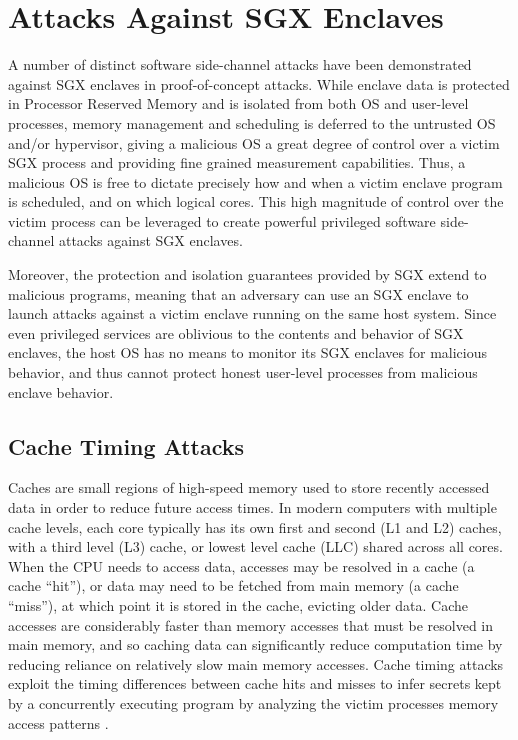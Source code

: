 \section{Attacks Against SGX Enclaves}

A number of distinct software side-channel attacks have been demonstrated against SGX enclaves in proof-of-concept attacks. While enclave data is protected in Processor Reserved Memory and is isolated from both OS and user-level processes, memory management and scheduling is deferred to the untrusted OS and/or hypervisor, giving a malicious OS a great degree of control over a victim SGX process and providing fine grained measurement capabilities. Thus, a malicious OS is free to dictate precisely how and when a victim enclave program is scheduled, and on which logical cores. This high magnitude of control over the victim process can be leveraged to create powerful privileged software side-channel attacks against SGX enclaves. 

Moreover, the protection and isolation guarantees provided by SGX extend to malicious programs, meaning that an adversary can use an SGX enclave to launch attacks against a victim enclave running on the same host system. Since even privileged services are oblivious to the contents and behavior of SGX enclaves, the host OS has no means to monitor its SGX enclaves for malicious behavior, and thus cannot protect honest user-level processes from malicious enclave behavior.

\subsection{Cache Timing Attacks}

Caches are small regions of high-speed memory used to store recently accessed data in order to reduce future access times. In modern computers with multiple cache levels, each core typically has its own first and second (L1 and L2) caches, with a third level (L3) cache, or lowest level cache (LLC) shared across all cores. When the CPU needs to access data, accesses may be resolved in a cache (a cache ``hit''), or data may need to be fetched from main memory (a cache ``miss''), at which point it is stored in the cache, evicting older data. Cache accesses are considerably faster than memory accesses that must be resolved in main memory, and so caching data can significantly reduce computation time by reducing reliance on relatively slow main memory accesses. Cache timing attacks exploit the timing differences between cache hits and misses to infer secrets kept by a concurrently executing program by analyzing the victim processes memory access patterns \cite{costan_intel_2016, moghimi_cachezoom:_2017}.  

